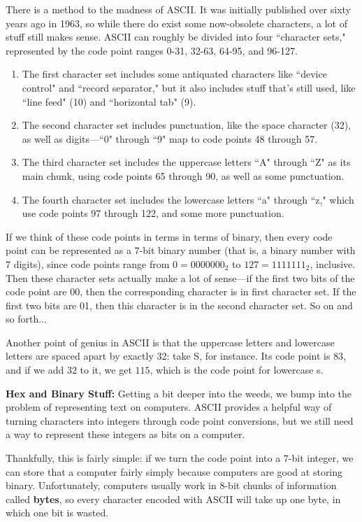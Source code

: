 \documentclass{article}
\begin{document}
\begin{multicols}{3}
There is a method to the madness of ASCII. It was initially published over sixty years ago in 1963, so while there do exist some now-obsolete characters, a lot of stuff still makes sense. ASCII can roughly be divided into four ``character sets," represented by the code point ranges 0-31, 32-63, 64-95, and 96-127.
\begin{enumerate}
    \item The first character set includes some antiquated characters like ``device control" and ``record separator," but it also includes stuff that's still used, like ``line feed" (10) and ``horizontal tab" (9).
    \item The second character set includes punctuation, like the space character (32), as well as digits—``0" through ``9" map to code points 48 through 57.
    \item The third character set includes the uppercase letters ``A" through ``Z" as its main chunk, using code points 65 through 90, as well as some punctuation.
    \item The fourth character set includes the lowercase letters ``a" through ``z," which use code points 97 through 122, and some more punctuation.
\end{enumerate}

If we think of these code points in terms in terms of binary, then every code point can be represented as a $7$-bit binary number (that is, a binary number with $7$ digits), since code points range from $0=0000000_2$ to $127=1111111_2$, inclusive. Then these character sets actually make a lot of sense—if the first two bits of the code point are 00, then the corresponding character is in first character set. If the first two bits are 01, then this character is in the second character set. So on and so forth...

Another point of genius in ASCII is that the uppercase letters and lowercase letters are spaced apart by exactly 32: take S, for instance. Its code point is $83$, and if we add $32$ to it, we get $115$, which is the code point for lowercase s.

\textbf{Hex and Binary Stuff:}
Getting a bit deeper into the weeds, we bump into the problem of representing text on computers. ASCII provides a helpful way of turning characters into integers through code point conversions, but we still need a way to represent these integers as bits on a computer.

Thankfully, this is fairly simple: if we turn the code point into a $7$-bit integer, we can store that a computer fairly simply because computers are good at storing binary. Unfortunately, computers usually work in $8$-bit chunks of information called \textbf{bytes}, so every character encoded with ASCII will take up one byte, in which one bit is wasted.


\end{multicols}
\end{document}
